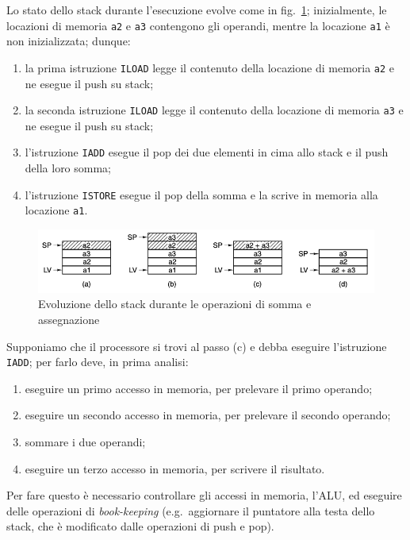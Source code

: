 \documentclass[a4paper,12pt]{scrreprt}
\begin{document}
Lo stato dello stack durante l'esecuzione evolve come in
fig.~\ref{fig:stack_add}; inizialmente, le locazioni di memoria \lstinline{a2} e
\lstinline{a3} contengono gli operandi, mentre la locazione \lstinline{a1} è non
inizializzata; dunque:
\renewcommand{\labelenumi}{(\alph{enumi})}
\begin{enumerate}
  \item la prima istruzione \lstinline{ILOAD} legge il contenuto della locazione
  di memoria \lstinline{a2} e ne esegue il push su stack;
  \item la seconda istruzione \lstinline{ILOAD} legge il contenuto della
  locazione di memoria \lstinline{a3} e ne esegue il push su stack;
  \item l'istruzione \lstinline{IADD} esegue il pop dei due elementi in cima
  allo stack e il push della loro somma;
  \item l'istruzione \lstinline{ISTORE} esegue il pop della somma e la scrive in
  memoria alla locazione \lstinline{a1}.
\end{enumerate}
\renewcommand{\labelenumi}{\arabic{enumi}.}

\begin{figure}
  \centering
  \includegraphics[width=\textwidth]{stack_add.png}
  \caption{Evoluzione dello stack durante le operazioni di somma e
    assegnazione}\label{fig:stack_add}
\end{figure}

Supponiamo che il processore si trovi al passo (c) e debba eseguire l'istruzione
\lstinline{IADD}; per farlo deve, in prima analisi:
\begin{enumerate}
  \item eseguire un primo accesso in memoria, per prelevare il primo operando;
  \item eseguire un secondo accesso in memoria, per prelevare il secondo
  operando;
  \item sommare i due operandi;
  \item eseguire un terzo accesso in memoria, per scrivere il risultato.
\end{enumerate}

Per fare questo è necessario controllare gli accessi in memoria, l'ALU, ed
eseguire delle operazioni di \textit{book-keeping} (e.g.~aggiornare il puntatore
alla testa dello stack, che è modificato dalle operazioni di push e pop).
\end{document}
